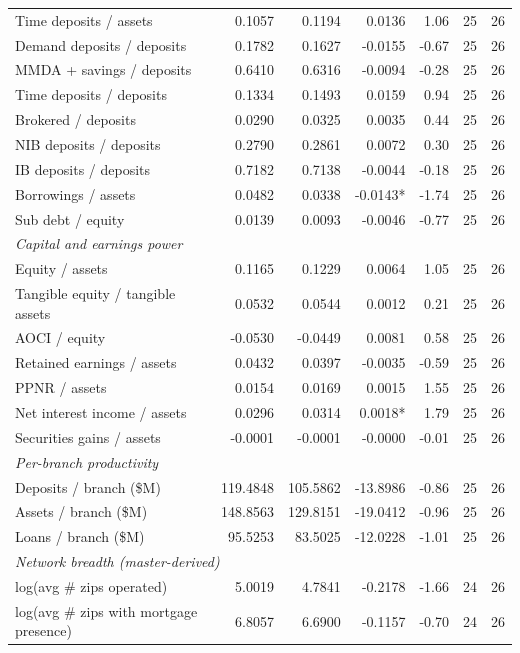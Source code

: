 \begin{tabular}{lrrrrrr}
Time deposits / assets & 0.1057 & 0.1194 & 0.0136 & 1.06 & 25 & 26 \\
Demand deposits / deposits & 0.1782 & 0.1627 & -0.0155 & -0.67 & 25 & 26 \\
MMDA + savings / deposits & 0.6410 & 0.6316 & -0.0094 & -0.28 & 25 & 26 \\
Time deposits / deposits & 0.1334 & 0.1493 & 0.0159 & 0.94 & 25 & 26 \\
Brokered / deposits & 0.0290 & 0.0325 & 0.0035 & 0.44 & 25 & 26 \\
NIB deposits / deposits & 0.2790 & 0.2861 & 0.0072 & 0.30 & 25 & 26 \\
IB deposits / deposits & 0.7182 & 0.7138 & -0.0044 & -0.18 & 25 & 26 \\
Borrowings / assets & 0.0482 & 0.0338 & -0.0143* & -1.74 & 25 & 26 \\
Sub debt / equity & 0.0139 & 0.0093 & -0.0046 & -0.77 & 25 & 26 \\
\midrule
\multicolumn{7}{l}{\emph{Capital and earnings power}} \\
\midrule
Equity / assets & 0.1165 & 0.1229 & 0.0064 & 1.05 & 25 & 26 \\
Tangible equity / tangible assets & 0.0532 & 0.0544 & 0.0012 & 0.21 & 25 & 26 \\
AOCI / equity & -0.0530 & -0.0449 & 0.0081 & 0.58 & 25 & 26 \\
Retained earnings / assets & 0.0432 & 0.0397 & -0.0035 & -0.59 & 25 & 26 \\
PPNR / assets & 0.0154 & 0.0169 & 0.0015 & 1.55 & 25 & 26 \\
Net interest income / assets & 0.0296 & 0.0314 & 0.0018* & 1.79 & 25 & 26 \\
Securities gains / assets & -0.0001 & -0.0001 & -0.0000 & -0.01 & 25 & 26 \\
\midrule
\multicolumn{7}{l}{\emph{Per-branch productivity}} \\
\midrule
Deposits / branch (\$M) & 119.4848 & 105.5862 & -13.8986 & -0.86 & 25 & 26 \\
Assets / branch (\$M) & 148.8563 & 129.8151 & -19.0412 & -0.96 & 25 & 26 \\
Loans / branch (\$M) & 95.5253 & 83.5025 & -12.0228 & -1.01 & 25 & 26 \\
\midrule
\multicolumn{7}{l}{\emph{Network breadth (master-derived)}} \\
\midrule
log(avg \# zips operated) & 5.0019 & 4.7841 & -0.2178 & -1.66 & 24 & 26 \\
log(avg \# zips with mortgage presence) & 6.8057 & 6.6900 & -0.1157 & -0.70 & 24 & 26 \\

\end{tabular}
